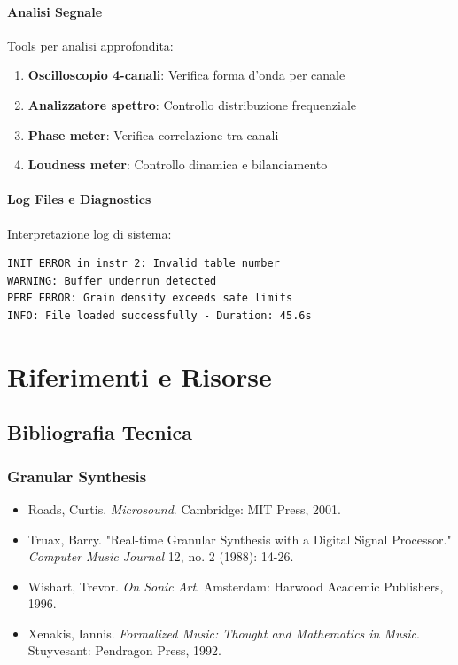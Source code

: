 \documentclass[a4paper,11pt,openany]{book}
\begin{document}
\subsubsection{Analisi Segnale}

Tools per analisi approfondita:

\begin{enumerate}
    \item \textbf{Oscilloscopio 4-canali}: Verifica forma d'onda per canale
    \item \textbf{Analizzatore spettro}: Controllo distribuzione frequenziale
    \item \textbf{Phase meter}: Verifica correlazione tra canali
    \item \textbf{Loudness meter}: Controllo dinamica e bilanciamento
\end{enumerate}

\subsubsection{Log Files e Diagnostics}

Interpretazione log di sistema:

\begin{lstlisting}[caption={Esempio log Csound per debugging}, label={lst:csound_log}]
INIT ERROR in instr 2: Invalid table number
WARNING: Buffer underrun detected
PERF ERROR: Grain density exceeds safe limits
INFO: File loaded successfully - Duration: 45.6s
\end{lstlisting}

\chapter{Riferimenti e Risorse}

\section{Bibliografia Tecnica}

\subsection{Granular Synthesis}

\begin{itemize}
    \item Roads, Curtis. \textit{Microsound}. Cambridge: MIT Press, 2001.
    \item Truax, Barry. "Real-time Granular Synthesis with a Digital Signal Processor." \textit{Computer Music Journal} 12, no. 2 (1988): 14-26.
    \item Wishart, Trevor. \textit{On Sonic Art}. Amsterdam: Harwood Academic Publishers, 1996.
    \item Xenakis, Iannis. \textit{Formalized Music: Thought and Mathematics in Music}. Stuyvesant: Pendragon Press, 1992.
\end{itemize}
\end{document}
